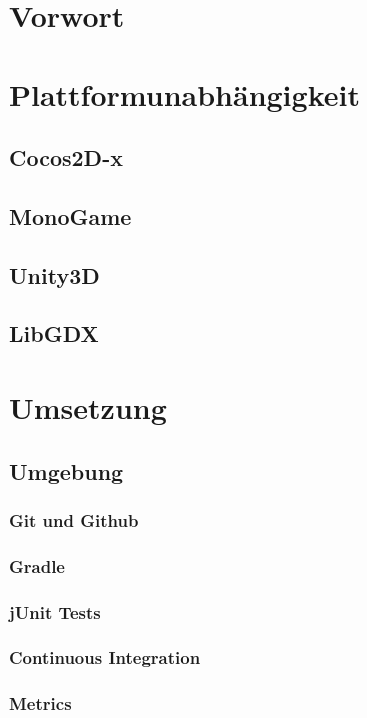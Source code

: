 \section{Vorwort}									
\section{Plattformunabhängigkeit}					
	\subsection{Cocos2D-x}							
	\subsection{MonoGame}							
	\subsection{Unity3D}							
	\subsection{LibGDX}								
\section{Umsetzung}
	\subsection{Umgebung}
		\subsubsection{Git und Github}				
		\subsubsection{Gradle}						
		\subsubsection{jUnit Tests}					
		\subsubsection{Continuous Integration}		
		\subsubsection{Metrics}						
